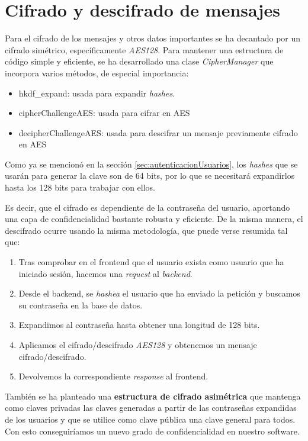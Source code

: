\documentclass[a4paper,11pt]{article}
\begin{document}
\section{Cifrado y descifrado de mensajes}
Para el cifrado de los mensajes y otros datos importantes se ha decantado por un cifrado simétrico, específicamente \textit{AES128}. Para mantener una estructura de código simple y eficiente, se ha desarrollado una clase \textit{CipherManager} que incorpora varios métodos, de especial importancia:
\begin{itemize}
    \item hkdf\_expand: usada para expandir \textit{hashes}.
    \item cipherChallengeAES: usada para cifrar en AES
    \item decipherChallengeAES: usada para descifrar un mensaje previamente cifrado en AES
\end{itemize}

Como ya se mencionó en la sección \ref{sec:autenticacionUsuarios}, los \textit{hashes} que se usarán para generar la clave son de 64 bits, por lo que se necesitará expandirlos hasta los 128 bits para trabajar con ellos.

Es decir, que el cifrado es dependiente de la contraseña del usuario, aportando una capa de confidencialidad bastante robusta y eficiente. De la misma manera, el descifrado ocurre usando la misma metodología, que puede verse resumida tal que:
\begin{enumerate}
    \item Tras comprobar en el frontend que el usuario exista como usuario que ha iniciado sesión, hacemos una \textit{request} al \textit{backend}.
    \item Desde el backend, se \textit{hashea} el usuario que ha enviado la petición y buscamos su contraseña en la base de datos.
    \item Expandimos al contraseña hasta obtener una longitud de 128 bits.
    \item Aplicamos el cifrado/descifrado \textit{AES128} y obtenemos un mensaje cifrado/descifrado.
    \item Devolvemos la correspondiente \textit{response} al frontend.
\end{enumerate}

También se ha planteado una \textbf{estructura de cifrado asimétrica} que mantenga como claves privadas las claves generadas a partir de las contraseñas expandidas de los usuarios y que se utilice como clave pública una clave general para todos. Con esto conseguiríamos un nuevo grado de confidencialidad en nuestro software. 
\end{document}
